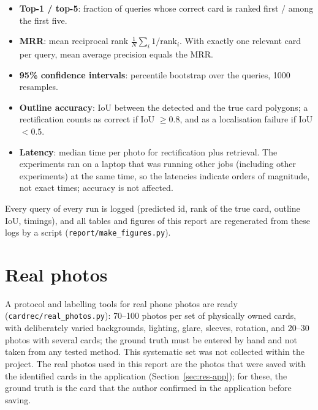 \begin{itemize}
  \item \textbf{Top-1 / top-5}: fraction of queries whose correct card is ranked first / among the first five.
  \item \textbf{MRR}: mean reciprocal rank $\frac{1}{N}\sum_i 1/\text{rank}_i$. With exactly one relevant card per query, mean average precision equals the MRR.
  \item \textbf{95\% confidence intervals}: percentile bootstrap \citep{efron1979bootstrap} over the queries, 1000 resamples.
  \item \textbf{Outline accuracy}: IoU between the detected and the true card polygons; a rectification counts as correct if IoU $\geq 0.8$, and as a localisation failure if IoU $< 0.5$.
  \item \textbf{Latency}: median time per photo for rectification plus retrieval. The experiments ran on a laptop that was running other jobs (including other experiments) at the same time, so the latencies indicate orders of magnitude, not exact times; accuracy is not affected.
\end{itemize}
Every query of every run is logged (predicted id, rank of the true card, outline IoU, timings), and all tables and figures of this report are regenerated from these logs by a script (\texttt{report/make\_figures.py}).

\section{Real photos}
\label{sec:realphotos}

A protocol and labelling tools for real phone photos are ready (\texttt{cardrec/real\_photos.py}): 70--100 photos per set of physically owned cards, with deliberately varied backgrounds, lighting, glare, sleeves, rotation, and 20--30 photos with several cards; the ground truth must be entered by hand and not taken from any tested method. This systematic set was not collected within the project. The real photos used in this report are the  photos that were saved with the identified cards in the application (Section~\ref{sec:res-app}); for these, the ground truth is the card that the author confirmed in the application before saving.

